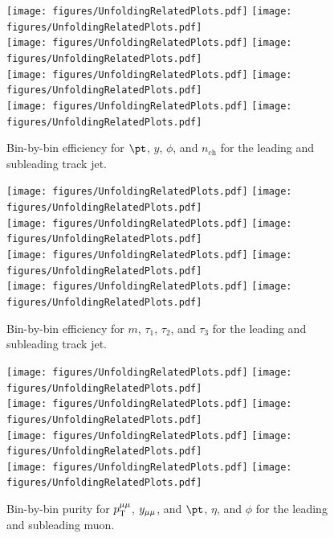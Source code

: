 \begin{figure}[h!]
  \centering
  \texttt{[image: figures/UnfoldingRelatedPlots.pdf]}
  \texttt{[image: figures/UnfoldingRelatedPlots.pdf]} \\
  \texttt{[image: figures/UnfoldingRelatedPlots.pdf]}
  \texttt{[image: figures/UnfoldingRelatedPlots.pdf]} \\
  \texttt{[image: figures/UnfoldingRelatedPlots.pdf]}
  \texttt{[image: figures/UnfoldingRelatedPlots.pdf]} \\
  \texttt{[image: figures/UnfoldingRelatedPlots.pdf]}
  \texttt{[image: figures/UnfoldingRelatedPlots.pdf]}
  \caption{Bin-by-bin efficiency for $\pt$, $y$, $\phi$, and $n_{\text{ch}}$ for the leading and subleading track jet.}
  \label{fig:binEffTJ1}
\end{figure}

\begin{figure}[h!]
  \centering
  \texttt{[image: figures/UnfoldingRelatedPlots.pdf]}
  \texttt{[image: figures/UnfoldingRelatedPlots.pdf]} \\
  \texttt{[image: figures/UnfoldingRelatedPlots.pdf]}
  \texttt{[image: figures/UnfoldingRelatedPlots.pdf]} \\
  \texttt{[image: figures/UnfoldingRelatedPlots.pdf]}
  \texttt{[image: figures/UnfoldingRelatedPlots.pdf]} \\
  \texttt{[image: figures/UnfoldingRelatedPlots.pdf]}
  \texttt{[image: figures/UnfoldingRelatedPlots.pdf]}
  \caption{Bin-by-bin efficiency for $m$, $\tau_1$, $\tau_2$, and $\tau_3$ for the leading and subleading track jet.}
  \label{fig:binEffTJ2}
\end{figure}

\begin{figure}[h!]
  \centering
  \texttt{[image: figures/UnfoldingRelatedPlots.pdf]}
  \texttt{[image: figures/UnfoldingRelatedPlots.pdf]} \\
  \texttt{[image: figures/UnfoldingRelatedPlots.pdf]}
  \texttt{[image: figures/UnfoldingRelatedPlots.pdf]} \\
  \texttt{[image: figures/UnfoldingRelatedPlots.pdf]}
  \texttt{[image: figures/UnfoldingRelatedPlots.pdf]} \\
  \texttt{[image: figures/UnfoldingRelatedPlots.pdf]}
  \texttt{[image: figures/UnfoldingRelatedPlots.pdf]}
  \caption{Bin-by-bin purity for $p_\mathrm{T}^{\mu\mu}$, $y_{\mu\mu}$, and $\pt$, $\eta$, and $\phi$ for the leading and subleading muon.}
  \label{fig:binPurDilep}
\end{figure}

